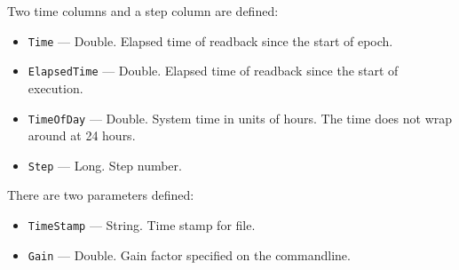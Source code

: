 \begin{itemize}
\begin{itemize}
Two time columns and a step column are defined: 
\begin{itemize}
        \item {\tt Time} --- Double. Elapsed time of readback since the start of epoch.
        \item {\tt ElapsedTime} --- Double. Elapsed time of readback since the start of execution.
        \item {\tt TimeOfDay} --- Double. System time in units of hours. The time does not wrap around at 24 hours.
        \item {\tt Step} --- Long. Step number.
\end{itemize}

There are two parameters defined:
\begin{itemize}
        \item {\tt TimeStamp} --- String. Time stamp for file.
        \item {\tt Gain} --- Double. Gain factor specified on the commandline.
\end{itemize}
\end{itemize}


\end{itemize}
